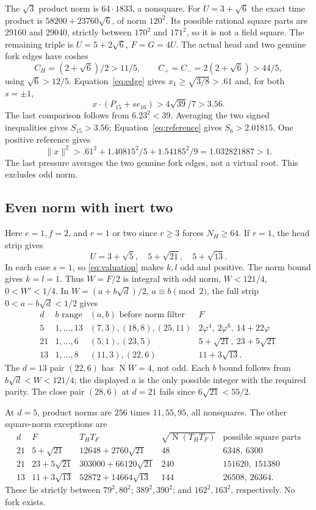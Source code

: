 \documentclass[11pt]{article}
\newcommand{\N}{\operatorname{N}}
\begin{document}
The $\sqrt3$ product norm is $64\cdot1833$, a nonsquare.
For $U=3+\sqrt6$ the exact time product is
$58200+23760\sqrt6$, of norm $120^2$.
Its possible rational square parts are 29160 and 29040,
strictly between $170^2$ and $171^2$, so it is not a field square.
The remaining triple is $U=5+2\sqrt6$, $F=G=4U$.
The actual head and two genuine fork edges have coshes
\[
 C_H=(2+\sqrt6)/2>11/5,\qquad
 C_+=C_-=2(2+\sqrt6)>44/5,
\]
using $\sqrt6>12/5$. Equation~\eqref{eq:edge} gives
$x_1\ge\sqrt{3/8}>.61$ and, for both $s=\pm1$,
\[
 x\cdot(P_{15}+s e_{16})>4\sqrt{39}/7>3.56.
\]
The last comparison follows from $6.23^2<39$.
Averaging the two signed inequalities gives $S_{15}>3.56$;
Equation~\eqref{eq:reference} gives $S_6>2.01815$.
One positive reference gives
\[
 \|x\|^2>.61^2+1.40815^2/5+1.54185^2/9
 =1.032821887>1.
\]
The last pressure averages the two genuine fork edges, not a virtual
root. This excludes odd norm.

\subsection{Even norm with inert two}
Here $e=1,f=2$, and $r=1$ or two since $r\ge3$ forces
$N_H\ge64$. If $r=1$, the head strip gives
\[
 U=3+\sqrt5,\quad5+\sqrt{21},\quad5+\sqrt{13}.
\]
In each case $s=1$, so \eqref{eq:valuation} makes $k,l$
odd and positive. The norm bound gives $k=l=1$.
Thus $W=F/2$ is integral with odd norm,
$W<121/4$, $0<W'<1/4$.
In $W=(a+b\sqrt d)/2$, $a\equiv b\pmod2$, the full
strip $0<a-b\sqrt d<1/2$ gives
\[
\begin{array}{r|c|l|l}
d&b\text{ range}&(a,b)\text{ before norm filter}&F\\\hline
5&1,\ldots,13&(7,3),(18,8),(25,11)&
 2\varphi^4,\ 2\varphi^6,\ 14+22\varphi\\
21&1,\ldots,6&(5,1),(23,5)&5+\sqrt{21},\ 23+5\sqrt{21}\\
13&1,\ldots,8&(11,3),(22,6)&11+3\sqrt{13}.
\end{array}
\]
The $d=13$ pair $(22,6)$ has $\N W=4$, not odd.
Each $b$ bound follows from $b\sqrt d<W<121/4$;
the displayed $a$ is the only possible integer with the required
parity. The close pair $(28,6)$ at $d=21$ fails since
$6\sqrt{21}<55/2$.

At $d=5$, product norms are $256$ times $11,55,95$,
all nonsquares. The other square-norm exceptions are
\[
\begin{array}{r|l|l|r|l}
d&F&T_HT_F&\sqrt{\N(T_HT_F)}&\text{possible square parts}\\\hline
21&5+\sqrt{21}&12648+2760\sqrt{21}&48&6348,\ 6300\\
21&23+5\sqrt{21}&303000+66120\sqrt{21}&240&151620,\ 151380\\
13&11+3\sqrt{13}&52872+14664\sqrt{13}&144&26508,\ 26364.
\end{array}
\]
These lie strictly between $79^2,80^2$;
$389^2,390^2$; and $162^2,163^2$, respectively.
No fork exists.
\end{document}
